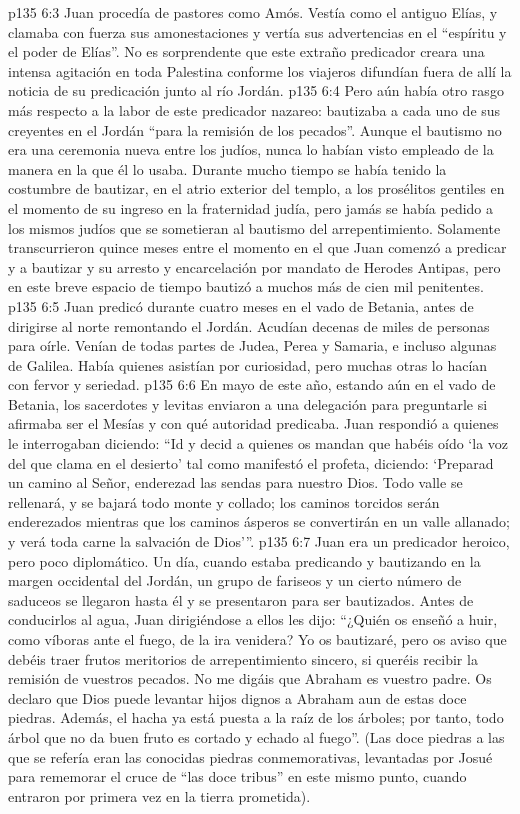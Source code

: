 \vs p135 6:3 Juan procedía de pastores como Amós. Vestía como el antiguo Elías, y clamaba con fuerza sus amonestaciones y vertía sus advertencias en el “espíritu y el poder de Elías”. No es sorprendente que este extraño predicador creara una intensa agitación en toda Palestina conforme los viajeros difundían fuera de allí la noticia de su predicación junto al río Jordán.
\vs p135 6:4 Pero aún había otro rasgo más  respecto a la labor de este predicador nazareo: bautizaba a cada uno de sus creyentes en el Jordán “para la remisión de los pecados”. Aunque el bautismo no era una ceremonia nueva entre los judíos, nunca lo habían visto empleado de la manera en la que él lo usaba. Durante mucho tiempo se había tenido la costumbre de bautizar, en el atrio exterior del templo, a los prosélitos gentiles en el momento de su ingreso en la fraternidad judía, pero jamás se había pedido a los mismos judíos que se sometieran al bautismo del arrepentimiento. Solamente transcurrieron quince meses entre el momento en el que Juan comenzó a predicar y a bautizar y su arresto y encarcelación por mandato de Herodes Antipas, pero en este breve espacio de tiempo bautizó a muchos más de cien mil penitentes.
\vs p135 6:5 Juan predicó durante cuatro meses en el vado de Betania, antes de dirigirse al norte remontando el Jordán. Acudían decenas de miles de personas para oírle. Venían de todas partes de Judea, Perea y Samaria, e incluso algunas de Galilea. Había quienes asistían por curiosidad, pero muchas otras lo hacían con fervor y seriedad.
\vs p135 6:6 En mayo de este año, estando aún en el vado de Betania, los sacerdotes y levitas enviaron a una delegación para preguntarle si afirmaba ser el Mesías y con qué autoridad predicaba. Juan respondió a quienes le interrogaban diciendo: “Id y decid a quienes os mandan que habéis oído ‘la voz del que clama en el desierto’ tal como manifestó el profeta, diciendo: ‘Preparad un camino al Señor, enderezad las sendas para nuestro Dios. Todo valle se rellenará, y se bajará todo monte y collado; los caminos torcidos serán enderezados mientras que los caminos ásperos se convertirán en un valle allanado; y verá toda carne la salvación de Dios’”.
\vs p135 6:7 Juan era un predicador heroico, pero poco diplomático. Un día, cuando estaba predicando y bautizando en la margen occidental del Jordán, un grupo de fariseos y un cierto número de saduceos se llegaron hasta él y se presentaron para ser bautizados. Antes de conducirlos al agua, Juan dirigiéndose a ellos les dijo: “¿Quién os enseñó a huir, como víboras ante el fuego, de la ira venidera? Yo os bautizaré, pero os aviso que debéis traer frutos meritorios de arrepentimiento sincero, si queréis recibir la remisión de vuestros pecados. No me digáis que Abraham es vuestro padre. Os declaro que Dios puede levantar hijos dignos a Abraham aun de estas doce piedras. Además, el hacha ya está puesta a la raíz de los árboles; por tanto, todo árbol que no da buen fruto es cortado y echado al fuego”. (Las doce piedras a las que se refería eran las conocidas piedras conmemorativas, levantadas por Josué para rememorar el cruce de “las doce tribus” en este mismo punto, cuando entraron por primera vez en la tierra prometida).
